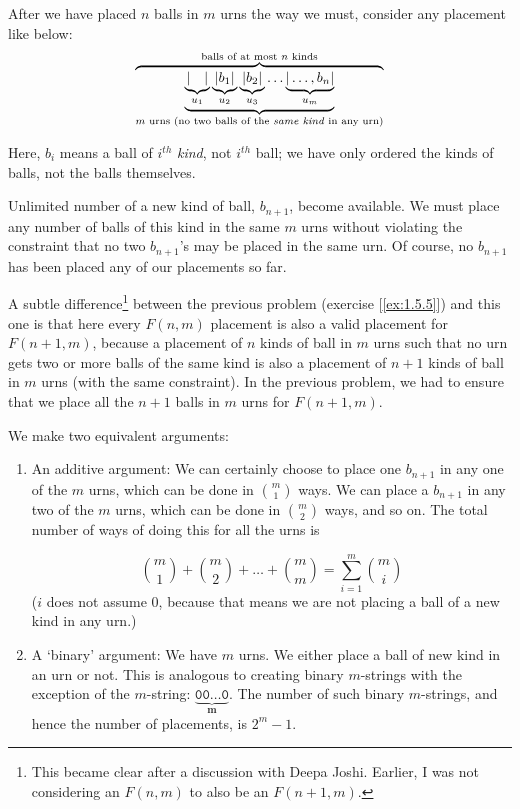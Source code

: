 \documentclass[11pt]{book}
\theoremstyle{definition}
\theoremstyle{plain}
\theoremstyle{definition}
\theoremstyle{problemstyle}
\theoremstyle{remark}
\theoremstyle{definition}
\begin{document}
After we have placed $n$ balls in $m$ urns the way we must, consider any placement like below:
    \[
        \overbrace{
            \underbrace{\underbrace{|\quad|}_{u_1}\underbrace{|b_1|}_{u_2}\underbrace{|b_2|}_{u_3}\dots\underbrace{|\dots,b_n|}_{u_m}}_{m\text{ urns (no two balls of the \emph{same kind} in any urn)}}
    }^{\text{balls of at most } n\text{ kinds}}
    \]

Here, $b_i$ means a ball of $i^{th}$ \emph{kind}, not $i^{th}$ ball; we have only ordered the kinds of balls, not the balls themselves.

Unlimited number of a new kind of ball, $b_{n+1}$, become available. We must place any number of balls of this kind in the same $m$ urns without violating the constraint that no two $b_{n+1}$'s may be placed in the same urn. Of course, no $b_{n+1}$ has been placed any of our placements so far.

A subtle difference\footnote{This became clear after a discussion with Deepa Joshi. Earlier, I was not considering an $F(n,m)$ to also be an $F(n+1,m)$.} between the previous problem (exercise [\ref{ex:1.5.5}]) and this one is that here every $F(n,m)$ placement is also a valid placement for $F(n+1,m)$, because a placement of $n$ kinds of ball in $m$ urns such that no urn gets two or more balls of the same kind is also a placement of $n+1$ kinds of ball in $m$ urns (with the same constraint). In the previous problem, we had to ensure that we place all the $n+1$ balls in $m$ urns for $F(n+1,m)$.

We make two equivalent arguments:
\begin{enumerate}
    \item An additive argument: We can certainly choose to place one $b_{n+1}$ in any one of the $m$ urns, which can be done in $\binom{m}{1}$ ways. We can place a $b_{n+1}$ in any two of the $m$ urns, which can be done in $\binom{m}{2}$ ways, and so on. The total number of ways of doing this for all the urns is

        \[
            \binom{m}{1}+\binom{m}{2}+\dots+\binom{m}{m}=\sum_{i=1}^m\binom{m}{i}
        \]
        ($i$ does not assume $0$, because that means we are not placing a ball of a new kind in any urn.)
    \item A `binary' argument: We have $m$ urns. We either place a ball of new kind in an urn or not. This is analogous to creating binary $m$-strings with the exception of the $m$-string: $\underbrace{\mathtt{00\dots0}}_{\mathbf{m}}$. The number of such binary $m$-strings, and hence the number of placements, is $2^m-1$.
\end{enumerate}
\end{document}
